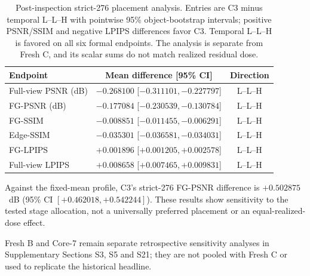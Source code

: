 \documentclass[times,twocolumn,final]{elsarticle}
\providecommand{\DIFadd}[1]{{\protect\color{blue} \sf #1}} %
\providecommand{\DIFaddbegin}{} %
\providecommand{\DIFaddend}{} %
\providecommand{\DIFaddFL}[1]{\DIFadd{#1}} %
\providecommand{\DIFaddbeginFL}{\DIFaddbegin} %
\providecommand{\DIFaddendFL}{\DIFaddend} %
\renewcommand{\DIFaddbeginFL}{}
\renewcommand{\DIFaddendFL}{}
\renewcommand{\DIFaddFL}[1]{#1}
\begin{document}
  \DIFaddbeginFL \begin{table}[t]
\DIFaddendFL \centering
  \DIFaddbeginFL \scriptsize
\DIFaddendFL \setlength{\tabcolsep}{4pt}
  \DIFaddbeginFL \caption{Post-inspection strict-276 placement analysis. Entries are C3 minus temporal L--L--H with pointwise 95\% object-bootstrap intervals; positive PSNR/SSIM and negative LPIPS differences favor C3. Temporal L--L--H is favored on all six formal endpoints. The analysis is separate from Fresh C, and its scalar sums do not match realized residual dose.}
\label{tab:temporal-placement}
\begin{tabular}{lcc}
\DIFaddendFL \toprule
  \DIFaddbeginFL \DIFaddFL{Endpoint }& \DIFaddFL{Mean difference }[\DIFaddFL{95\% CI}] \DIFaddendFL & \DIFaddbeginFL \DIFaddFL{Direction }\\
\midrule
\DIFaddFL{Full-view PSNR (dB) }& \DIFaddFL{$-0.268100$ }[\DIFaddFL{$-0.311101,-0.227797$}] & \DIFaddFL{L--L--H }\\
\DIFaddFL{FG-PSNR (dB) }& \DIFaddFL{$-0.177084$ }[\DIFaddFL{$-0.230539,-0.130784$}] & \DIFaddFL{L--L--H }\\
\DIFaddendFL FG-SSIM   & \DIFaddbeginFL \DIFaddFL{$-0.008851$ }[\DIFaddFL{$-0.011455,-0.006291$}] & \DIFaddFL{L--L--H }\\
\DIFaddendFL Edge-SSIM   &   \DIFaddbeginFL \DIFaddFL{$-0.035301$ }[\DIFaddFL{$-0.036581,-0.034031$}] & \DIFaddFL{L--L--H }\\
\DIFaddFL{FG-LPIPS }& \DIFaddFL{$+0.001896$ }[\DIFaddFL{$+0.001205,+0.002578$}] & \DIFaddFL{L--L--H }\\
\DIFaddFL{Full-view LPIPS }& \DIFaddFL{$+0.008658$ }[\DIFaddFL{$+0.007465,+0.009831$}] & \DIFaddFL{L--L--H }\\
\bottomrule
\end{tabular}
\end{table}

\DIFaddFL{Against the fixed-mean profile, C3's strict-276 FG-PSNR difference is $+0.502875$~dB (95\% CI $[+0.462018,+0.542244]$). These results show sensitivity to the tested stage allocation, not a universally preferred placement or an equal-realized-dose effect.
}

\DIFaddFL{Fresh B and Core-7 remain separate retrospective sensitivity analyses in Supplementary Sections S3, S5 and S21; they are not pooled with Fresh C or used to replicate the historical headline.
}
\end{document}
